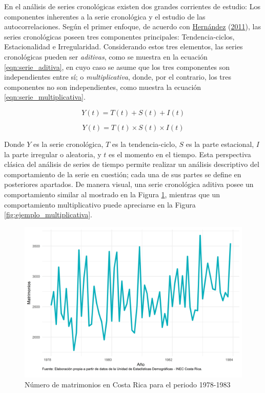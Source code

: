 \documentclass[
]{article}
\begin{document}
En el análisis de series cronológicas existen dos grandes corrientes de
estudio: Los componentes inherentes a la serie cronológica y el estudio
de las autocorrelaciones. Según el primer enfoque, de acuerdo con
\protect\hyperlink{ref-oscarh-1}{Hernández}
(\protect\hyperlink{ref-oscarh-1}{2011}), las series cronológicas poseen
tres componentes principales: Tendencia-ciclos, Estacionalidad e
Irregularidad. Considerando estos tres elementos, las series
cronológicas pueden ser \emph{aditivas}, como se muestra en la ecuación
\eqref{eqn:serie_aditiva}, en cuyo caso se asume que los tres
componentes son independientes entre sí; o \emph{multiplicativa}, donde,
por el contrario, los tres componentes no son independientes, como
muestra la ecuación \eqref{eqn:serie_multiplicativa}.

\newpage

\begin{equation}
\label{eqn:serie_aditiva}
Y(t)=T(t)+S(t)+I(t)
\end{equation}

\begin{equation}
\label{eqn:serie_multiplicativa}
Y(t)=T(t)\times S(t)\times I(t)
\end{equation}

Donde \(Y\) es la serie cronológica, \(T\) es la tendencia-ciclo, \(S\)
es la parte estacional, \(I\) la parte irregular o aleatoria, y \(t\) es
el momento en el tiempo. Esta perspectiva clásica del análisis de series
de tiempo permite realizar un análisis descriptivo del comportamiento de
la serie en cuestión; cada una de sus partes se define en posteriores
apartados. De manera visual, una serie cronológica aditiva posee un
comportamiento similar al mostrado en la Figura
\ref{fig:ejemplo_aditiva}, mientras que un comportamiento multiplicativo
puede apreciarse en la Figura \ref{fig:ejemplo_multiplicativa}.

\begin{figure}[H]
\includegraphics[width=1\linewidth,height=1\textheight]{Tesis_files/figure-latex/ejemplo_aditiva-1} \caption{Número de matrimonios en Costa Rica para el periodo 1978-1983}\label{fig:ejemplo_aditiva}
\end{figure}
\end{document}
